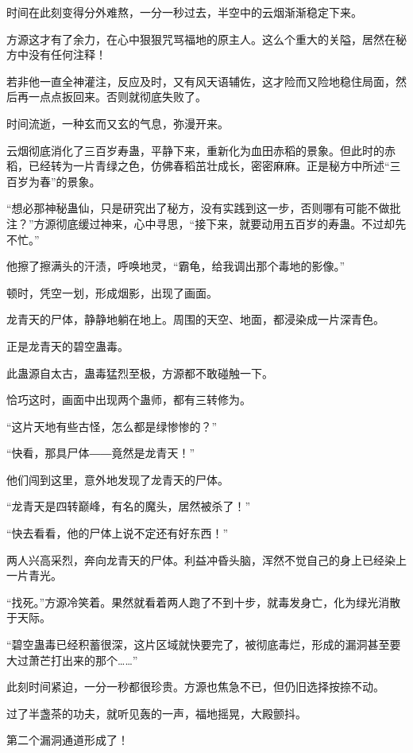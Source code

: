 
\begin{this_body}

时间在此刻变得分外难熬，一分一秒过去，半空中的云烟渐渐稳定下来。

方源这才有了余力，在心中狠狠咒骂福地的原主人。这么个重大的关隘，居然在秘方中没有任何注释！

若非他一直全神灌注，反应及时，又有风天语辅佐，这才险而又险地稳住局面，然后再一点点扳回来。否则就彻底失败了。

时间流逝，一种玄而又玄的气息，弥漫开来。

云烟彻底消化了三百岁寿蛊，平静下来，重新化为血田赤稻的景象。但此时的赤稻，已经转为一片青绿之色，仿佛春稻茁壮成长，密密麻麻。正是秘方中所述“三百岁为春”的景象。

“想必那神秘蛊仙，只是研究出了秘方，没有实践到这一步，否则哪有可能不做批注？”方源彻底缓过神来，心中寻思，“接下来，就要动用五百岁的寿蛊。不过却先不忙。”

他擦了擦满头的汗渍，呼唤地灵，“霸龟，给我调出那个毒地的影像。”

顿时，凭空一划，形成烟影，出现了画面。

龙青天的尸体，静静地躺在地上。周围的天空、地面，都浸染成一片深青色。

正是龙青天的碧空蛊毒。

此蛊源自太古，蛊毒猛烈至极，方源都不敢碰触一下。

恰巧这时，画面中出现两个蛊师，都有三转修为。

“这片天地有些古怪，怎么都是绿惨惨的？”

“快看，那具尸体――竟然是龙青天！”

他们闯到这里，意外地发现了龙青天的尸体。

“龙青天是四转巅峰，有名的魔头，居然被杀了！”

“快去看看，他的尸体上说不定还有好东西！”

两人兴高采烈，奔向龙青天的尸体。利益冲昏头脑，浑然不觉自己的身上已经染上一片青光。

“找死。”方源冷笑着。果然就看着两人跑了不到十步，就毒发身亡，化为绿光消散于天际。

“碧空蛊毒已经积蓄很深，这片区域就快要完了，被彻底毒烂，形成的漏洞甚至要大过萧芒打出来的那个……”

此刻时间紧迫，一分一秒都很珍贵。方源也焦急不已，但仍旧选择按捺不动。

过了半盏茶的功夫，就听见轰的一声，福地摇晃，大殿颤抖。

第二个漏洞通道形成了！


\end{this_body}
